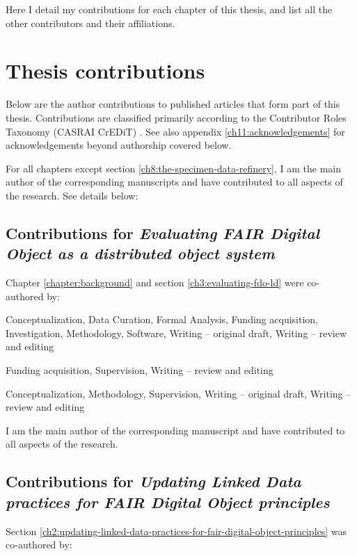 \label{ch10:contributions} 

Here I detail my contributions for each chapter of this thesis, and
list all the other contributors and their affiliations.



\section{Thesis contributions}\label{ch10:my-contributions}

Below are the author contributions to published articles that form part
of this thesis. Contributions are classified primarily according to the
Contributor Roles Taxonomy (CASRAI CrEDiT) \cite{Brand 2015}. See 
also appendix \vref{ch11:acknowledgements} for acknowledgements beyond authorship covered below.

For all chapters except section \ref{ch8:the-specimen-data-refinery}, I am the main author of the corresponding
manuscripts and have contributed to all aspects of the research. See details below:


\subsection{Contributions for \emph{Evaluating FAIR Digital
Object as a distributed object system}}

Chapter \vref{chapter:background} and section \vref{ch3:evaluating-fdo-ld} were co-authored by:

\begin{description}
\tightlist
\item[Stian Soiland-Reyes]
Conceptualization, Data Curation, Formal Analysis, Funding acquisition, Investigation,
Methodology, Software, Writing -- original draft, Writing -- review and
editing
\item[Carole Goble]
Funding acquisition, Supervision, Writing -- review and editing
\item[Paul Groth]
Conceptualization, Methodology, Supervision, Writing -- original draft, Writing -- review
and editing
\end{description}

I am the main author of the corresponding manuscript and have contributed to all aspects of the research. 


\subsection{Contributions for \emph{Updating
Linked Data practices for FAIR Digital Object principles}}
Section \vref{ch2:updating-linked-data-practices-for-fair-digital-object-principles} was co-authored by:

